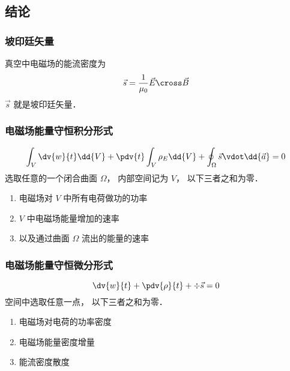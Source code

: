 


\subsection{结论}

\subsubsection{坡印廷矢量}
真空中电磁场的能流密度为
\begin{equation}
\vec s = \frac{1}{\mu_0} \vec E \cross \vec B
\end{equation} 
$\vec s$ 就是坡印廷矢量．

\subsubsection{电磁场能量守恒积分形式}
\begin{equation}
\int_V \dv{w}{t} \dd{V}  + \pdv{t} \int_V \rho_E \dd{V}  + \oint_\Omega  \vec s \vdot \dd{\vec a}  = 0
\end{equation} 
选取任意的一个闭合曲面 $\Omega $， 内部空间记为 $V$， 以下三者之和为零．
\begin{enumerate}
\item 电磁场对 $V$ 中所有电荷做功的功率
\item $V$ 中电磁场能量增加的速率
\item 以及通过曲面 $\Omega $ 流出的能量的速率
\end{enumerate}

\subsubsection{电磁场能量守恒微分形式}
\begin{equation}
\dv{w}{t} + \pdv{\rho}{t} + \div \vec s = 0
\end{equation} 
空间中选取任意一点， 以下三者之和为零．
\begin{enumerate}
\item 电磁场对电荷的功率密度
\item 电磁场能量密度增量
\item 能流密度散度
\end{enumerate}

